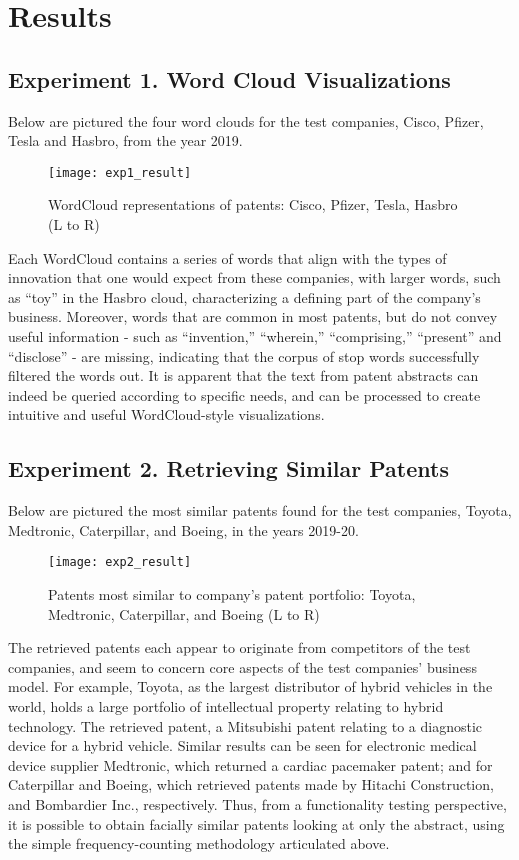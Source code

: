 \documentclass{article}
\begin{document}
\section{Results}
\subsection{Experiment 1. Word Cloud Visualizations}
Below are pictured the four word clouds for the test companies, Cisco, Pfizer, Tesla and Hasbro, from the year 2019.

\begin{figure}[H]
\texttt{[image: exp1\_result]}
\centering
\caption{WordCloud representations of patents: Cisco, Pfizer, Tesla, Hasbro (L to R)}
\label{fig:exp1_result}
\end{figure}

Each WordCloud contains a series of words that align with the types of innovation that one would expect from these companies, with larger words, such as “toy” in the Hasbro cloud, characterizing a defining part of the company’s business.  Moreover, words that are common in most patents, but do not convey useful information - such as “invention,” “wherein,” “comprising,” “present” and “disclose” - are missing, indicating that the corpus of stop words successfully filtered the words out.  It is apparent that the text from patent abstracts can indeed be queried according to specific needs, and can be processed to create intuitive and useful WordCloud-style visualizations.

\subsection{Experiment 2. Retrieving Similar Patents}
Below are pictured the most similar patents found for the test companies, Toyota, Medtronic, Caterpillar, and Boeing, in the years 2019-20.

\begin{figure}[H]
\texttt{[image: exp2\_result]}
\centering
\caption{Patents most similar to company’s patent portfolio: Toyota, Medtronic, Caterpillar, and Boeing (L to R)}
\label{fig:exp2_result}
\end{figure}

The retrieved patents each appear to originate from competitors of the test companies, and seem to concern core aspects of the test companies’ business model.  For example, Toyota, as the largest distributor of hybrid vehicles in the world, holds a large portfolio of intellectual property relating to hybrid technology.  The retrieved patent, a Mitsubishi patent relating to a diagnostic device for a hybrid vehicle.  Similar results can be seen for electronic medical device supplier Medtronic, which returned a cardiac pacemaker patent; and for Caterpillar and Boeing, which retrieved patents made by Hitachi Construction, and Bombardier Inc., respectively.  Thus, from a functionality testing perspective, it is possible to obtain facially similar patents looking at only the abstract, using the simple frequency-counting methodology articulated above.
\end{document}
